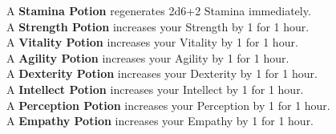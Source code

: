 A \textbf{Stamina Potion} regenerates 2d6+2 Stamina immediately.\\

A \textbf{Strength Potion} increases your Strength by 1 for 1 hour.\\

A \textbf{Vitality Potion} increases your Vitality by 1 for 1 hour.\\

A \textbf{Agility Potion} increases your Agility by 1 for 1 hour.\\

A \textbf{Dexterity Potion} increases your Dexterity by 1 for 1 hour.\\

A \textbf{Intellect Potion} increases your Intellect by 1 for 1 hour.\\

A \textbf{Perception Potion} increases your Perception by 1 for 1 hour.\\

A \textbf{Empathy Potion} increases your Empathy by 1 for 1 hour.\\